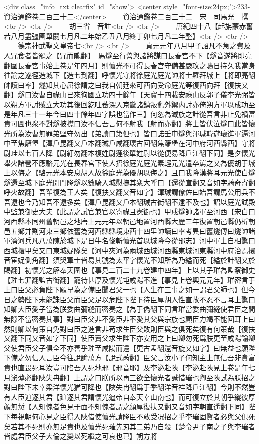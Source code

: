 <div class="info_txt clearfix" id="show">
<center style="font-size:24px;">233-資治通鑑卷二百三十二</center>
  　　資治通鑑卷二百三十二　宋　司馬光　撰<br />
<br />
　　胡三省　音註<br />
<br />
　　唐紀四十八【起旃蒙赤奮若八月盡彊圉單閼七月凡二年始乙丑八月終丁卯七月凡二年整】<br />
<br />
　　德宗神武聖文皇帝七<br />
<br />
　　貞元元年八月甲子詔凡不急之費及人冗食者皆罷之【冗而隴翻】　馬燧至行營與諸將謀曰長春宫不下【燧音遂將即亮翻圍長春宮事始上卷是年四月】則懷光不可得長春宫守備甚嚴攻之曠日持久我當身往諭之遂徑造城下【造七到翻】呼懷光守將徐庭光庭光帥將士羅拜城上【將即亮翻帥讀曰率】燧知其心屈徐謂之曰我自朝廷來可西向受命庭光等復西向拜【復扶又翻】燧曰汝曹自祿山已來徇國立功四十餘年【天寶十四載安祿山反郭子儀李光弼皆以朔方軍討賊立大功其後回紇吐蕃深入京畿諸鎮叛亂外禦内討亦倚朔方軍以成功至是年凡三十一年今曰四十餘年四字誤也當作三】何忽為滅族之計從吾言非止免禍富貴可圖也衆不對燧披襟曰汝不信吾言何不射我【射而亦翻】將士皆伏泣燧曰此皆懷光所為汝曹無罪弟堅守勿出【弟讀曰第但也】皆曰諾壬申燧與渾瑊韓遊瓌進軍逼河中至焦籬堡【渾戶昆翻又戶本翻瑊戶咸翻瓌古回翻焦籬堡在河中府河西縣西】守將尉珪以七百人降【尉紆勿翻本複姓尉遲後單姓尉以從便易降戶江翻下同】是夕懷光舉火諸營不應駱元光在長春宫下使人招徐庭光庭光素輕元光遣卒罵之又為優胡于城上以侮之【駱元光本安息胡人故徐庭光為優胡以侮之】且曰我降漢將耳元光使白燧燧還至城下庭光開門降燧以數騎入城慰撫其衆大呼曰【還從宣翻又音如字騎奇寄翻呼火故翻】吾輩復為王人矣【復扶又翻又音如字】渾瑊謂僚佐曰始吾謂馬公用兵不吾逮也今乃知吾不逮多矣【渾戶昆翻又戶本翻瑊古衘翻不逮不及也】詔以庭光試殿中監兼御史大夫【此謂之試官兼官以寄祿且憲衘也】甲戍燧帥諸軍至河西【宋白曰河西縣本同州舊朝邑之地唐上元元年以朝邑地置河西縣大歷三年復置朝邑縣仍析朝邑五鄉并割河東三鄉依舊為河西縣縣境東西十四里帥讀曰率考異曰舊燧傳曰燧帥諸軍濟河兵凡八萬陳於城下是日牛名俊斬懷光首以城降今從邠志】河中軍士自相驚曰西城擐甲矣又曰東城娖隊矣【河中夾河為兩城西城河西縣東城河東縣河中府治焉擐音宦娖側角翻】須臾軍士皆易其號為太平字懷光不知所為乃縊而死【縊於計翻又於賜翻】初懷光之解奉天圍也【事見二百二十九卷建中四年】上以其子璀為監察御史【璀七罪翻監古衘翻】寵待甚厚及懷光屯咸陽不進【事見上卷興元元年】璀密言于上曰臣父必負陛下願早為之備臣聞君父一也【人生在三事之如一謂君父師也】但今日之勢陛下未能誅臣父而臣父足以危陛下陛下待臣厚胡人性直故不忍不言耳上驚曰知卿大臣愛子當為朕委曲彌縫而密奏之【為于偽翻下同言璀當委曲彌縫使君臣之間無隙不當密奏其事】對曰臣父非不愛臣非不愛其父與宗族也顧臣力竭不能回耳上曰然則卿以何策自免對曰臣之進言非苟求生臣父敗則臣與之俱死矣復有何策哉【復扶又翻下同又音如字下同】使臣賣父求生陛下亦安用之上曰卿勿死爲朕更至咸陽諭卿父使君臣父子俱全不亦善乎璀至咸陽而還【更古孟翻還音旋又如字】曰無益也願陛下備之勿信人言臣今往說諭萬方【說式芮翻】臣父言汝小子何知主上無信吾非貪富貴也直畏死耳汝豈可陷吾入死地邪【邪音耶】及李泌赴陜【李泌赴陜見上卷是年七月泌薄必翻陜失冉翻】上謂之曰朕所以再三欲全懷光者誠惜璀也卿至陜試為朕招之對曰陛下未幸梁洋懷光猶可降也【陜失冉翻爲于季翻洋音祥降戶江翻】今則不然豈有人臣迫逐其君【廹逐其君謂懷光逼帝自奉天幸山南也】而可復立於其朝乎縱彼厚顔無慙【人知愧者色見于面不知愧者謂之顔厚復扶又翻又音如字朝直遥翻下同】陛下每視朝何心見之臣得入陜借使懷光請降臣不敢受况招之乎李璀固賢者必與父俱死矣若其不死則亦無足貴也及懷光死璀先刃其二弟乃自殺【楚令尹子南之子與李璀者皆處君臣父子大倫之變以死繼之可哀也已】朔方將